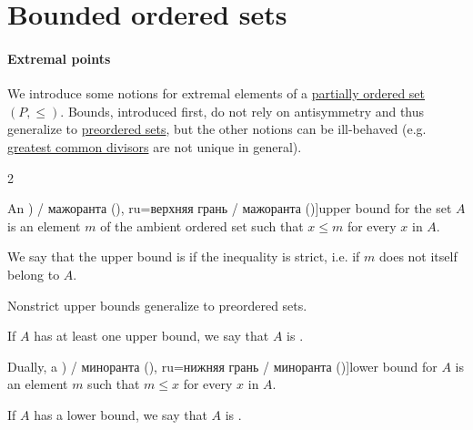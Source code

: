 \section{Bounded ordered sets}\label{sec:bounded_ordered_sets}

\paragraph{Extremal points}

\begin{definition}\label{def:extremal_points}
  We introduce some notions for extremal elements of a \hyperref[def:partially_ordered_set]{partially ordered set} \( (P, \leq) \). Bounds, introduced first, do not rely on antisymmetry and thus generalize to \hyperref[def:preordered_set]{preordered sets}, but the other notions can be ill-behaved (e.g. \hyperref[def:gcd]{greatest common divisors} are not unique in general).

  \begin{thmenum}
    \begin{paracol}{2}
      \begin{leftcolumn}
        An \term[bg=горна граница (\cite[18]{Тагамлицки1971ДиференциалноСмятане}) / мажоранта (\cite[10]{Проданов1982ФункционаленАнализЧаст1}), ru=верхняя грань / мажоранта (\cite[def. 3.8]{Гуров2013ТеорияРешёток})]{upper bound} for the set \( A \) is an element \( m \) of the ambient ordered set such that \( x \leq m \) for every \( x \) in \( A \).

        We say that the upper bound is  if the inequality is strict, i.e. if \( m \) does not itself belong to \( A \).

        Nonstrict upper bounds generalize to preordered sets.

        If \( A \) has at least one upper bound, we say that \( A \) is .
      \end{leftcolumn}

      \begin{rightcolumn}
        Dually, a \term[bg=долна граница (\cite[18]{Тагамлицки1971ДиференциалноСмятане}) / миноранта (\cite[10]{Проданов1982ФункционаленАнализЧаст1}), ru=нижняя грань / миноранта (\cite[def. 3.8]{Гуров2013ТеорияРешёток})]{lower bound} for \( A \) is an element \( m \) such that \( m \leq x \) for every \( x \) in \( A \).

        If \( A \) has a lower bound, we say that \( A \) is .


\end{rightcolumn}
\end{paracol}
\end{thmenum}
\end{definition}
